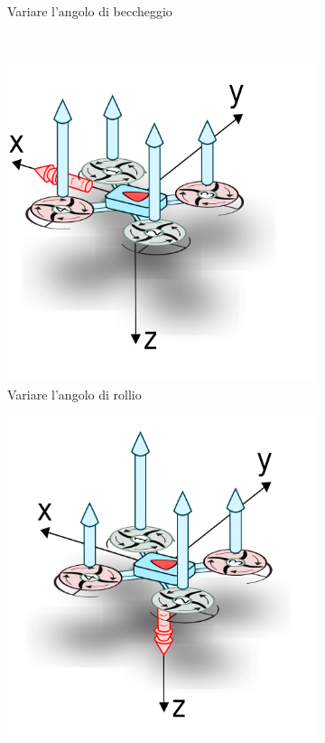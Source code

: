 \begin{figure}
\begin{subfigure}{0.45\textwidth}
		\caption{Variare l'angolo di beccheggio}
		\label{fig:modello_quad_pitch}
	\end{subfigure}
	\\
	\begin{subfigure}{0.45\textwidth}
		\centering
		\includegraphics[width=1\textwidth]{SistemaQuadrirotore/Figure/drone_roll}
		\caption{Variare l'angolo di rollio}
		\label{fig:modello_quad_roll}
	\end{subfigure}
	\hfill
	\begin{subfigure}{0.45\textwidth}
		\centering
		\includegraphics[width=1\textwidth]{SistemaQuadrirotore/Figure/drone_yaw}

\end{subfigure}
\end{figure}
